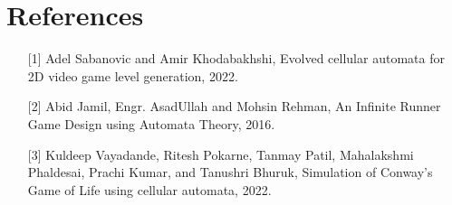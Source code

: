 \documentclass[12pt]{article}
\begin{document}
\section*{\small References}
\begin{enumerate}
    \item [{[1]}] Adel Sabanovic and Amir Khodabakhshi, Evolved cellular automata for 2D video game level generation, 2022.
    \item [{[2]}] Abid Jamil, Engr. AsadUllah and Mohsin Rehman, An Infinite Runner Game Design using Automata Theory, 2016.
    \item [{[3]}] Kuldeep Vayadande, Ritesh Pokarne, Tanmay Patil, Mahalakshmi Phaldesai, Prachi Kumar, and Tanushri Bhuruk, Simulation of Conway's Game of Life using cellular automata, 2022.
\end{enumerate}
\end{document}
